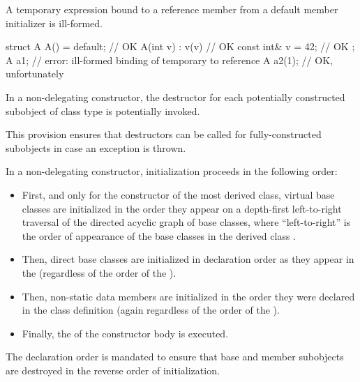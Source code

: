 \pnum
A temporary expression bound to a reference member from a
default member initializer is ill-formed.
\begin{example}
\begin{codeblock}
struct A {
  A() = default;        // OK
  A(int v) : v(v) { }   // OK
  const int& v = 42;    // OK
};
A a1;                   // error: ill-formed binding of temporary to reference
A a2(1);                // OK, unfortunately
\end{codeblock}
\end{example}

\pnum
In a non-delegating constructor, the destructor for each potentially constructed
subobject of class type is potentially invoked.
\begin{note}
This provision ensures that destructors can be called for fully-constructed
subobjects in case an exception is thrown.
\end{note}

\pnum
In a non-delegating constructor, initialization
proceeds in the following order:
\begin{itemize}
\item
{}%
First, and only for the constructor of the most derived class,
virtual base classes are initialized in the order they appear on a
depth-first left-to-right traversal of the directed acyclic graph of
base classes,
where ``left-to-right'' is the order of appearance of the base classes
in the derived class
.
\item
{}%
Then, direct base classes are initialized in declaration order
as they appear in the
(regardless of the order of the
).
\item
{}%
Then, non-static data members are initialized in the order
they were declared in the class definition
(again regardless of the order of the
).
\item
Finally, the  of the constructor
body  is executed.
\end{itemize}

\begin{note}
The declaration order is mandated to ensure that base and member
subobjects are destroyed in the reverse order of initialization.
\end{note}


